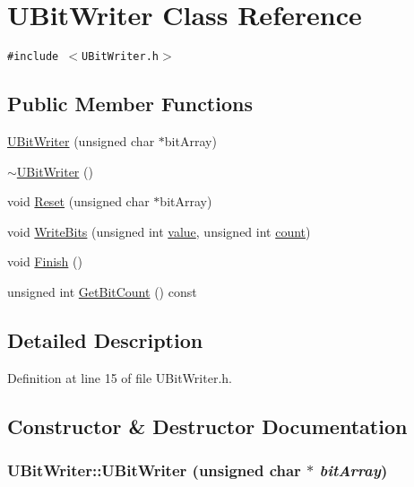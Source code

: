 \hypertarget{class_u_bit_writer}{
\section{UBitWriter Class Reference}
\label{class_u_bit_writer}
}
{\tt \#include $<$UBitWriter.h$>$}

\subsection*{Public Member Functions}
\begin{CompactItemize}
\item 
\hyperlink{class_u_bit_writer_e0ea6759ff034a9651c79c832230fa55}{UBitWriter} (unsigned char $\ast$bitArray)
\item 
\hyperlink{class_u_bit_writer_beaa31d5b432d83452d4515d81e6e17f}{$\sim$UBitWriter} ()
\item 
void \hyperlink{class_u_bit_writer_22c488a1b7f27b4e4be45fa9048746fb}{Reset} (unsigned char $\ast$bitArray)
\item 
void \hyperlink{class_u_bit_writer_c13e9a7c145b428ff95d716658bea5bb}{WriteBits} (unsigned int \hyperlink{glext__bak_8h_6a4f8a1a444e9080b297963b3db29fe0}{value}, unsigned int \hyperlink{wglext_8h_98d18d6b4e3ba4ed266c6fb54c839d70}{count})
\item 
void \hyperlink{class_u_bit_writer_e5a5a7cd5aaf0f4a9b91331d94825a33}{Finish} ()
\item 
unsigned int \hyperlink{class_u_bit_writer_f6f57344e33cbb035fab173f200d2f66}{GetBitCount} () const 
\end{CompactItemize}


\subsection{Detailed Description}


Definition at line 15 of file UBitWriter.h.

\subsection{Constructor \& Destructor Documentation}
\hypertarget{class_u_bit_writer_e0ea6759ff034a9651c79c832230fa55}{
\subsubsection[{UBitWriter}]{\setlength{\rightskip}{0pt plus 5cm}UBitWriter::UBitWriter (unsigned char $\ast$ {\em bitArray})}}
\label{class_u_bit_writer_e0ea6759ff034a9651c79c832230fa55}




